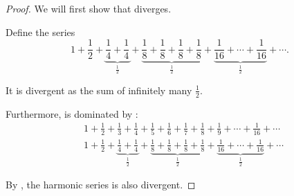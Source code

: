 \begin{proof}
   We will first show that  diverges.

  Define the series
  \begin{equation}\label{def:harmonic_progression/powers_of_two}
    1 + \frac 1 2 + \underbrace{\frac 1 4 + \frac 1 4}_{\tfrac 1 2} + \underbrace{\frac 1 8 + \frac 1 8 + \frac 1 8 + \frac 1 8}_{\tfrac 1 2} + \underbrace{\frac 1 {16} + \cdots + \frac 1 {16}}_{\tfrac 1 2} + \cdots.
  \end{equation}

  It is divergent as the sum of infinitely many \( \frac 1 2 \).

  Furthermore,  is dominated by :
  \begin{align*}
     & 1 + \frac 1 2 + \frac 1 3 + \frac 1 4 + \frac 1 5 + \frac 1 6 + \frac 1 7 + \frac 1 8 + \frac 1 9 + \cdots + \frac 1 {16} + \cdots
    \\
     & 1 + \frac 1 2 + \underbrace{\frac 1 4 + \frac 1 4}_{\tfrac 1 2} + \underbrace{\frac 1 8 + \frac 1 8 + \frac 1 8 + \frac 1 8}_{\tfrac 1 2} + \underbrace{\frac 1 {16} + \cdots + \frac 1 {16}}_{\tfrac 1 2} + \cdots
  \end{align*}

  By , the harmonic series  is also divergent.
\end{proof}
